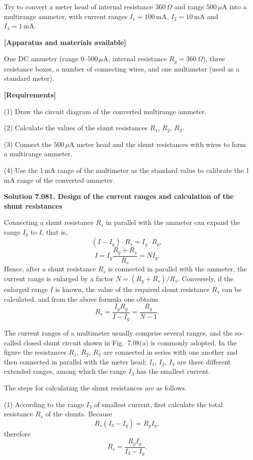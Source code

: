 Try to convert a meter head of internal resistance $360\,\Omega$ and range $500\,\mu$A into a multirange ammeter, with current ranges $I_1=100\,\mathrm{mA}$, $I_2=10\,\mathrm{mA}$ and $I_3=1\,\mathrm{mA}$.

\textbf{[Apparatus and materials available]}

One DC ammeter (range $0$--$500\,\mu$A, internal resistance $R_g=360\,\Omega$), three resistance boxes, a number of connecting wires, and one multimeter (used as a standard meter).

\textbf{[Requirements]}

(1) Draw the circuit diagram of the converted multirange ammeter.

(2) Calculate the values of the shunt resistances $R_1$, $R_2$, $R_3$.

(3) Connect the $500\,\mu$A meter head and the shunt resistances with wires to form a multirange ammeter.

(4) Use the 1\,mA range of the multimeter as the standard value to calibrate the 1\,mA range of the converted ammeter.

\textbf{Solution 7.08}\quad \textbf{1. Design of the current ranges and calculation of the shunt resistances}

Connecting a shunt resistance $R_s$ in parallel with the ammeter can expand the range $I_g$ to $I$, that is,
\[
(I-I_g)\cdot R_s=I_g\cdot R_g,
\]
\[
I=I_g\frac{R_g+R_s}{R_s}=NI_g.
\]
Hence, after a shunt resistance $R_s$ is connected in parallel with the ammeter, the current range is enlarged by a factor $N=(R_g+R_s)/R_s$. Conversely, if the enlarged range $I$ is known, the value of the required shunt resistance $R_s$ can be calculated, and from the above formula one obtains
\[
R_s=\frac{I_gR_g}{I-I_g}=\frac{R_g}{N-1}.
\]

The current ranges of a multimeter usually comprise several ranges, and the so-called closed shunt circuit shown in Fig.~7.08(a) is commonly adopted. In the figure the resistances $R_1$, $R_2$, $R_3$ are connected in series with one another and then connected in parallel with the meter head; $I_1$, $I_2$, $I_3$ are three different extended ranges, among which the range $I_3$ has the smallest current.

The steps for calculating the shunt resistances are as follows.

(1) According to the range $I_3$ of smallest current, first calculate the total resistance $R_s$ of the shunts. Because
\[
R_s(I_3-I_g)=R_gI_g,
\]
therefore
\[
R_s=\frac{R_gI_g}{I_3-I_g}.
\]

